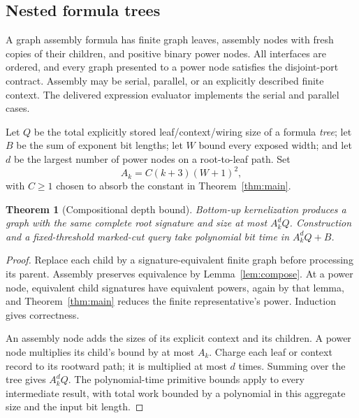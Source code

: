 \documentclass[11pt]{article}
\newtheorem{theorem}{Theorem}[section]
\theoremstyle{remark}\newtheorem{remark}[theorem]{Remark}
\begin{document}
\subsection{Nested formula trees}
A graph assembly formula has finite graph leaves, assembly nodes with fresh copies of their children, and positive binary power nodes. All interfaces are ordered, and every graph presented to a power node satisfies the disjoint-port contract. Assembly may be serial, parallel, or an explicitly described finite context. The delivered expression evaluator implements the serial and parallel cases.

Let $Q$ be the total explicitly stored leaf/context/wiring size of a formula \emph{tree}; let $B$ be the sum of exponent bit lengths; let $W$ bound every exposed width; and let $d$ be the largest number of power nodes on a root-to-leaf path. Set
\[
 A_k=C(k+3)(W+1)^2,
\]
with $C\ge1$ chosen to absorb the constant in Theorem~\ref{thm:main}.

\begin{theorem}[Compositional depth bound]\label{thm:nested}
Bottom-up kernelization produces a graph with the same complete root signature and size at most $A_k^d Q$. Construction and a fixed-threshold marked-cut query take polynomial bit time in $A_k^d Q+B$.
\end{theorem}
\begin{proof}
Replace each child by a signature-equivalent finite graph before processing its parent. Assembly preserves equivalence by Lemma~\ref{lem:compose}. At a power node, equivalent child signatures have equivalent powers, again by that lemma, and Theorem~\ref{thm:main} reduces the finite representative's power. Induction gives correctness.

An assembly node adds the sizes of its explicit context and its children. A power node multiplies its child's bound by at most $A_k$. Charge each leaf or context record to its rootward path; it is multiplied at most $d$ times. Summing over the tree gives $A_k^d Q$. The polynomial-time primitive bounds apply to every intermediate result, with total work bounded by a polynomial in this aggregate size and the input bit length.
\end{proof}
\end{document}
